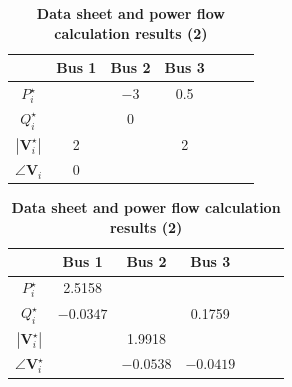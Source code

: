 \documentclass[graybox, envcountchap]{svmult}
\begin{document}
\begin{table}[ht]
\medskip
\caption{\textbf{Data sheet and power flow calculation results (2)}} \label{table:pflow2}
 \centering
  {
  \begin{minipage}{0.49\linewidth}
    \centering
  \begin{tabular}{|c|c|c|c|c|c|c|}
    \hline
  & Bus 1 & Bus 2 & Bus 3 \\
    \hline 
    $P_i^{\star}$ &  & $-3$ & 0.5 \\
    \hline    
    $Q_i^{\star}$ &  & 0 & \\
    \hline
    $|\bm{V}_i^{\star}|$ & 2 & & 2 \\
    \hline
    $\angle \bm{V}_i$ & 0 & &  \\
    \hline
  \end{tabular}
  \end{minipage}
  \begin{minipage}{0.49\linewidth}
    \centering
  \begin{tabular}{|c|c|c|c|c|c|c|}
    \hline
    & Bus 1 & Bus 2 & Bus 3 \\
    \hline 
    $P_i^{\star}$ & 2.5158 & &  \\
    \hline
    $Q_i^{\star}$ & $-0.0347$ & & 0.1759 \\
    \hline
    $|\bm{V}_i^{\star}|$ & & 1.9918 & \\
    \hline
    $\angle \bm{V}_i^{\star}$ & & $-0.0538$ & $-0.0419$ \\
    \hline
  \end{tabular}
  \end{minipage}
  }
\end{table}
\end{document}
